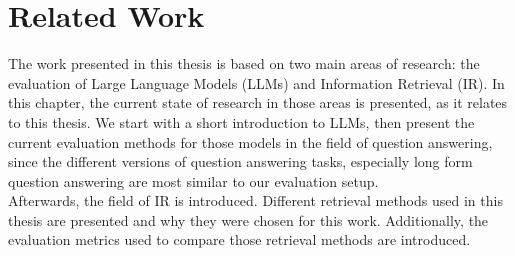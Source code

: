 \chapter{Related Work}\label{related-work}
The work presented in this thesis is based on two main areas of research: the evaluation of Large Language Models (LLMs) and Information Retrieval (IR).
In this chapter, the current state of research in those areas is presented, as it relates to this thesis.
We start with a short introduction to LLMs, then present the current evaluation methods for those models in the field of question answering, since the different versions of question answering tasks, especially long form question answering are most similar to our evaluation setup.
\\
Afterwards, the field of IR is introduced.
Different retrieval methods used in this thesis are presented and why they were chosen for this work.
Additionally, the evaluation metrics used to compare those retrieval methods are introduced.


